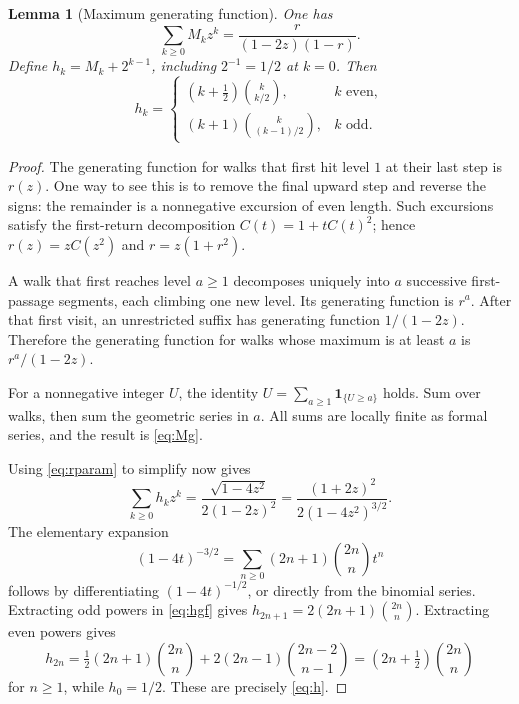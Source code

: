 \documentclass[11pt,letterpaper]{article}
\numberwithin{equation}{section}
\newtheorem{lemma}[theorem]{Lemma}
\theoremstyle{definition}
\begin{document}
\begin{lemma}[Maximum generating function]\label{lem:maximum}
One has
\begin{equation}\label{eq:Mg}
\sum_{k\ge0}M_kz^k=\frac{r}{(1-2z)(1-r)}.
\end{equation}
Define $h_k=M_k+2^{k-1}$, including $2^{-1}=1/2$ at $k=0$.  Then
\begin{equation}\label{eq:h}
h_k=\begin{cases}
(k+\tfrac12)\binom{k}{k/2},&k\text{ even},\\[2pt]
(k+1)\binom{k}{(k-1)/2},&k\text{ odd}.
\end{cases}
\end{equation}
\end{lemma}
\begin{proof}
The generating function for walks that first hit level $1$ at their
last step is $r(z)$.  One way to see this is to remove the final upward
step and reverse the signs: the remainder is a nonnegative excursion
of even length.  Such excursions satisfy the first-return decomposition
$C(t)=1+tC(t)^2$; hence $r(z)=zC(z^2)$ and
$r=z(1+r^2)$.

A walk that first reaches level $a\ge1$ decomposes uniquely into $a$
successive first-passage segments, each climbing one new level.  Its
generating function is $r^a$.  After that first visit, an unrestricted
suffix has generating function $1/(1-2z)$.  Therefore the generating
function for walks whose maximum is at least $a$ is
$r^a/(1-2z)$.

For a nonnegative integer $U$, the identity
$U=\sum_{a\ge1}\mathbf1_{\{U\ge a\}}$ holds.  Sum over walks, then sum the
geometric series in $a$.  All sums are locally finite as formal series,
and the result is \eqref{eq:Mg}.

Using \eqref{eq:rparam} to simplify now gives
\begin{equation}\label{eq:hgf}
\sum_{k\ge0}h_kz^k
=\frac{\sqrt{1-4z^2}}{2(1-2z)^2}
=\frac{(1+2z)^2}{2(1-4z^2)^{3/2}}.
\end{equation}
The elementary expansion
\[
(1-4t)^{-3/2}=\sum_{n\ge0}(2n+1)\binom{2n}{n}t^n
\]
follows by differentiating $(1-4t)^{-1/2}$, or directly from the binomial
series.  Extracting odd powers in \eqref{eq:hgf} gives
$h_{2n+1}=2(2n+1)\binom{2n}{n}$.
Extracting even powers gives
\[
h_{2n}=\tfrac12(2n+1)\binom{2n}{n}
       +2(2n-1)\binom{2n-2}{n-1}
       =(2n+\tfrac12)\binom{2n}{n}
\]
for $n\ge1$, while $h_0=1/2$.  These are precisely \eqref{eq:h}.
\end{proof}
\end{document}
